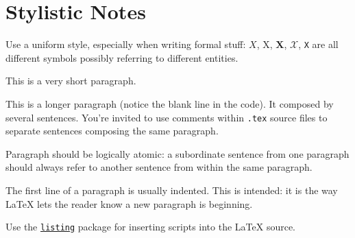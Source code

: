 \documentclass{scrartcl}
\begin{document}















\section*{Stylistic Notes}

Use a uniform style, especially when writing formal stuff: $X$, X, $\mathbf{X}$, $\mathcal{X}$, \texttt{X} are all different symbols possibly referring to different entities. 

This is a very short paragraph.

This is a longer paragraph (notice the blank line in the code).
It composed by several sentences.
%
You're invited to use comments within \texttt{.tex} source files to separate sentences composing the same paragraph.

Paragraph should be logically atomic: a subordinate sentence from one paragraph should always refer to another sentence from within the same paragraph.

The first line of a paragraph is usually indented.
%
This is intended: it is the way \LaTeX{} lets the reader know a new paragraph is beginning.

Use the \href{https://en.wikibooks.org/wiki/LaTeX/Source_Code_Listings}{\texttt{listing}} package for inserting scripts into the \LaTeX{} source.

\nocite{*} %


\end{document}
